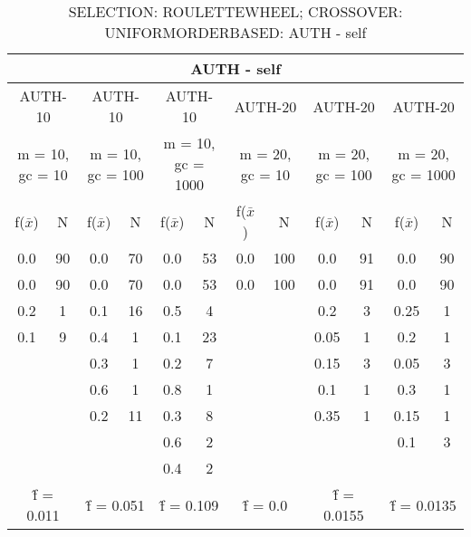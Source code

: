 \begin{table}[H]
	\centering
	\caption{SELECTION: ROULETTEWHEEL; CROSSOVER: UNIFORMORDERBASED: AUTH - self}
	\begin{adjustbox}{width=1\textwidth}
		\begin{tabular}{ |c|c||c|c||c|c||c|c||c|c||c|c| }
			\hline
			\multicolumn{12}{|c|}{AUTH - self} \\
			\hline
			\multicolumn{2}{|c||}{AUTH-10} & \multicolumn{2}{c||}{AUTH-10} & \multicolumn{2}{c||}{AUTH-10} & \multicolumn{2}{c||}{AUTH-20} & \multicolumn{2}{c||}{AUTH-20} & \multicolumn{2}{c|}{AUTH-20}\\
			\hline
			\multicolumn{2}{|c||}{m = 10, gc = 10} & \multicolumn{2}{c||}{m = 10, gc = 100} & \multicolumn{2}{c||}{m = 10, gc = 1000} & \multicolumn{2}{c||}{m = 20, gc = 10} & \multicolumn{2}{c||}{m = 20, gc = 100} & \multicolumn{2}{c|}{m = 20, gc = 1000}\\
			\hline
			f($\bar{x}$) & N & f($\bar{x}$) & N & f($\bar{x}$) & N & f($\bar{x}$) & N & f($\bar{x}$) & N & f($\bar{x}$) & N\\
			\hline
			\hline
			0.0 & 90 & 0.0 & 70 & 0.0 & 53 & 0.0 & 100 & 0.0 & 91 & 0.0 & 90\\
			\hline
			0.0 & 90 & 0.0 & 70 & 0.0 & 53 & 0.0 & 100 & 0.0 & 91 & 0.0 & 90\\
			0.2 & 1 & 0.1 & 16 & 0.5 & 4 &   &   & 0.2 & 3 & 0.25 & 1\\
			0.1 & 9 & 0.4 & 1 & 0.1 & 23 &   &   & 0.05 & 1 & 0.2 & 1\\
			&   & 0.3 & 1 & 0.2 & 7 &   &   & 0.15 & 3 & 0.05 & 3\\
			&   & 0.6 & 1 & 0.8 & 1 &   &   & 0.1 & 1 & 0.3 & 1\\
			&   & 0.2 & 11 & 0.3 & 8 &   &   & 0.35 & 1 & 0.15 & 1\\
			&   &   &   & 0.6 & 2 &   &   &   &   & 0.1 & 3\\
			&   &   &   & 0.4 & 2 &   &   &   &   &   &  \\
			\hline
			\multicolumn{2}{|c||}{\^{f} = 0.011} & \multicolumn{2}{c||}{\^{f} = 0.051} & \multicolumn{2}{c||}{\^{f} = 0.109} & \multicolumn{2}{c||}{\^{f} = 0.0} & \multicolumn{2}{c||}{\^{f} = 0.0155} & \multicolumn{2}{c|}{\^{f} = 0.0135}\\
			\hline
		\end{tabular}
	\end{adjustbox}
\end{table}
